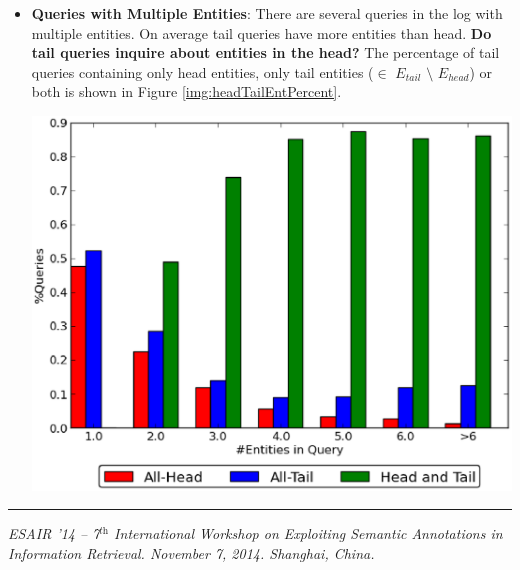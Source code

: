 \documentclass[a0,portrait,final]{a0poster}
\newcommand{\etail}[1]{$E_{tail}${}}
\newcommand{\ehead}[1]{$E_{head}${}}
\begin{document}
\begin{multicols}{2}
\begin {itemize}
	\item {\textbf{Queries with Multiple Entities}:} There are several queries in the log with multiple entities. 
	On average tail queries have more entities than head. \textbf{Do tail queries inquire about entities in the head?} The percentage of 		tail queries containing only head entities, only tail entities ($\in$ \etail{} $\setminus$ \ehead{}) or both is shown in 		Figure \ref{img:headTailEntPercent}.
	
	
		
		\vspace{10mm}
		\begin{center}
		\includegraphics[width=0.5\columnwidth]{img/entity-head-tail-count.eps}
		\label{img:headTailEntPercent}
		\end{center}
\end {itemize}



\end{multicols}
\vfill
\centering
\begin{minipage}[c]{\textwidth}
\rule{\textwidth}{1pt}
\textit{ESAIR '14  -- 7$^\textit{th}$ International Workshop on Exploiting Semantic Annotations in Information Retrieval. November 7, 2014. Shanghai, China.}
\end{minipage}
\end{document}
